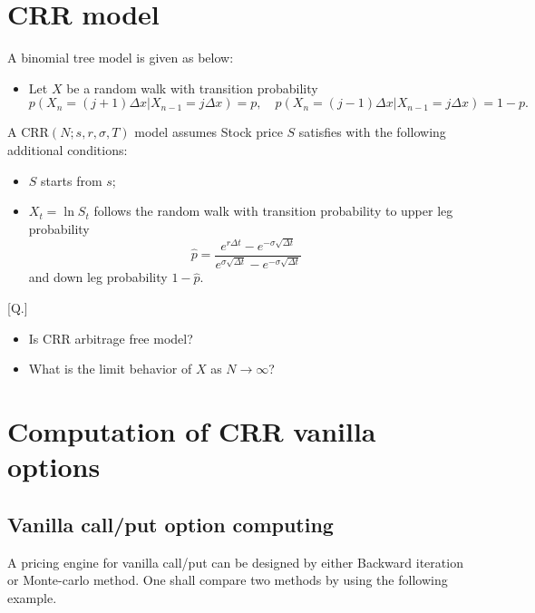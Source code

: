 \documentclass{article}
\begin{document}
\begin{center}
\end{center}


\section{CRR model}

A binomial tree model is given as below:
\begin{itemize}
 \item Let $X$ be a random walk with transition probability
 $$p(X_{n} = (j+1)\Delta x | X_{n-1} = j \Delta x) = p, 
 \quad 
 p(X_{n} = (j-1)\Delta x | X_{n-1} = j \Delta x) = 1-p.
 $$
 \end{itemize}

A CRR$(N; s, r, \sigma, T)$ model assumes Stock price $S$ satisfies
with the following additional conditions:
\begin{itemize}
 \item $S$ starts from $s$;
 \item $X_{t} = \ln S_{t}$ follows the random walk with transition probability 
to upper leg probability 
$$\hat p = \frac{e^{r\Delta t} - e^{-\sigma \sqrt{\Delta t}}}
{e^{\sigma \sqrt{\Delta t}} - e^{-\sigma \sqrt{\Delta t}}}$$
and down leg probability $1- \hat p$.
\end{itemize}

[Q.] 
\begin{itemize}
\item Is CRR arbitrage free model?
\item What is the limit behavior of $X$ as $N\to \infty$?
\end{itemize}


\section{Computation of CRR vanilla options}




\subsection{Vanilla call/put option computing}

A pricing engine for vanilla call/put can be designed by either Backward iteration or Monte-carlo method.
One shall compare two methods by using the following example.
\end{document}
